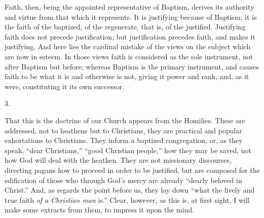 Faith, then, being the appointed representative of Baptism, derives
its authority and virtue from that which it represents. It is
justifying because of Baptism; it is the faith of the baptized, of the
regenerate, that is, of the justified. Justifying faith does not
precede justification; but justification precedes faith, and makes it
justifying. And here lies the cardinal mistake of the views on the
subject which are now in esteem. In those views faith is considered as
the sole instrument, not after Baptism but before; whereas Baptism is
the primary instrument, and causes faith to be what it is and
otherwise is not, giving it power and rank, and, as it were,
constituting it its own successor.

3.

That this is the doctrine of our Church appears from the Homilies.
These are addressed, not to heathens but to Christians, they are
practical and popular exhortations to Christians. They inform a
baptized congregation, or, as they speak, ``dear Christians,''
``good Christian people,'' how they may be saved, not how God
will deal with the heathen. They are not missionary discourses,
directing pagans how to proceed in order to be justified, but are
composed for the edification of those who through God's mercy are
already ``dearly beloved in Christ.'' And, as regards the
point before us, they lay down ``what the lively and true faith \emph{of
a Christian man} is.'' Clear, however, as this is, at first
sight, I will make some extracts from them, to impress it upon the
mind.

